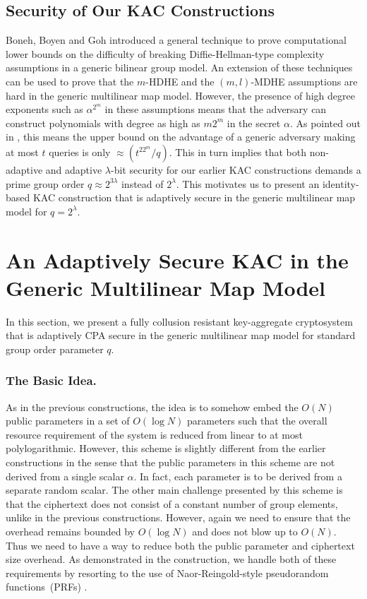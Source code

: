 \subsection{Security of Our KAC Constructions} 
\label{subsec:sec_duo}

Boneh, Boyen and Goh \cite{boneh2005hierarchical} introduced a general technique to prove computational lower bounds on the difficulty of breaking Diffie-Hellman-type complexity assumptions in a generic bilinear group model. An extension of these techniques can be used to prove that the $m$-HDHE and the $(m,l)$-MDHE assumptions are hard in the generic multilinear map model. However, the presence of high degree exponents such as $\alpha^{2^m}$ in these assumptions means that the adversary can construct polynomials with degree as high as $m2^m$ in the secret $\alpha$. As pointed out in \cite{boneh2014low}, this means the upper bound on the advantage of a generic adversary making at most $t$ queries is only $\approx \left(t^22^m/q\right)$. This in turn implies that both non-adaptive and adaptive $\lambda$-bit security for our earlier KAC constructions demands a prime group order $q\approx2^{3\lambda}$ instead of $2^{\lambda}$. This motivates us to present an identity-based KAC construction that is adaptively secure in the generic multilinear map model for $q=2^{\lambda}$.

\section{An Adaptively Secure KAC in the Generic Multilinear Map Model}
\label{sec:proposal3}

In this section, we present a fully collusion resistant key-aggregate cryptosystem that is adaptively CPA secure in the generic multilinear map model for standard group order parameter $q$. 

\subsubsection{The Basic Idea.}  As in the previous constructions, the idea is to somehow embed the $O(N)$ public parameters in a set of $O(\log N)$ parameters such that the overall resource requirement of the system is reduced from linear to at most polylogarithmic. However, this scheme is slightly different from the earlier constructions in the sense that the public parameters in this scheme are not derived from a single scalar $\alpha$. In fact, each parameter is to be derived from a separate random scalar. The other main challenge presented by this scheme is that the ciphertext does not consist of a constant number of group elements, unlike in the previous constructions. However, again we need to ensure that the overhead remains bounded by $O(\log N)$ and does not blow up to $O(N)$. Thus we need to have a way to reduce both the public parameter and ciphertext size overhead. As demonstrated in the construction, we handle both of these requirements by resorting to the use of Naor-Reingold-style pseudorandom functions~(PRFs) \cite{naor2004number}.          

